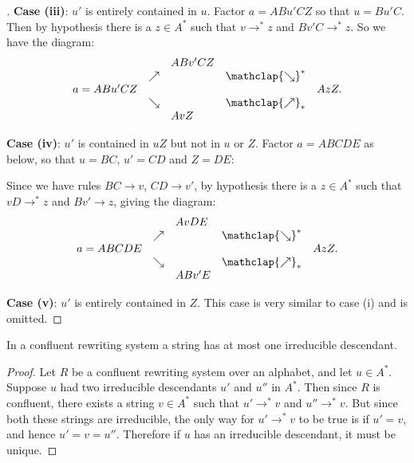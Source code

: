 \documentclass[noindex,noinsetproof,12pt]{lmaths}
\newcommand{\nearrowstar}{\mathclap{\nearrow}_{*}}
\newcommand{\searrowstar}{\mathclap{\searrow}^{*}}
\begin{document}
\begin{proof}[ ]
	\textbf{Case (iii)}: $u'$ is entirely contained in $u$. Factor $a = ABu'CZ$ so that $u = Bu'C$. Then by hypothesis there is a $z \in A^*$ such that $v \to^* z$ and $Bv'C \to^* z$. So we have the diagram: \[
		\begin{array}{lllll}
			& & ABv'CZ & & \\
			& \nearrow & & \searrowstar & \\
			a = ABu'CZ & & & & AzZ. \\
			& \searrow & & \nearrowstar & \\
			& & AvZ & &
		\end{array}
	\]

	\textbf{Case (iv)}: $u'$ is contained in $uZ$ but not in $u$ or $Z$. Factor $a = ABCDE$ as below, so that $u = BC$, $u' = CD$ and $Z = DE$:

	{\centering
	\par}

	Since we have rules $BC \to v$, $CD \to v'$, by hypothesis there is a $z \in A^*$ such that $vD \to^* z$ and $Bv' \to z$, giving the diagram: \[
		\begin{array}{lllll}
			& & AvDE & & \\
			& \nearrow & & \searrowstar & \\
			a = ABCDE & & & & AzZ. \\
			& \searrow & & \nearrowstar & \\
			& & ABv'E & &
		\end{array}
	\]

	\textbf{Case (v)}: $u'$ is entirely contained in $Z$. This case is very similar to case (i) and is omitted.
\end{proof}

\begin{prop}
	In a confluent rewriting system a string has at most one irreducible descendant. \label{prop:confluent-at-most-one}
\end{prop}
\begin{proof}
	Let $R$ be a confluent rewriting system over an alphabet, and let $u \in A^*$. Suppose $u$ had two irreducible descendants $u'$ and $u''$ in $A^*$. Then since $R$ is confluent, there exists a string $v \in A^*$ such that $u' \to^* v$ and $u'' \to^* v$. But since both these strings are irreducible, the only way for $u' \to^* v$ to be true is if $u' = v$, and hence $u' = v = u''$. Therefore if $u$ has an irreducible descendant, it must be unique.
\end{proof}
\end{document}
